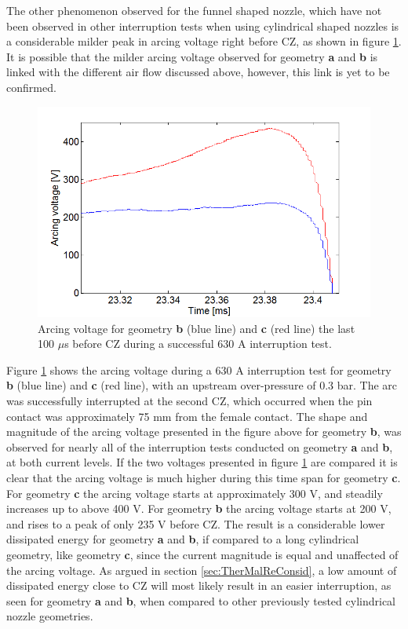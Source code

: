 \documentclass[10pt,b5paper,twoside]{article}
\begin{document}
The other phenomenon observed for the funnel shaped nozzle, which have not been observed in other interruption tests when using cylindrical shaped nozzles is a considerable milder peak in arcing voltage right before CZ, as shown in figure \ref{fig:mildFunnelArcVlotage}. It is possible that the milder arcing voltage observed for geometry \textbf{a} and \textbf{b} is linked with the different air flow discussed above, however, this link is yet to be confirmed.

\begin{figure}[H]
\centering
\includegraphics[scale=0.5]{Bilder/Results/arcingVoltageFunnelandCylinderBandC.png}
\caption{Arcing voltage for geometry \textbf{b} (blue line) and \textbf{c} (red line) the last 100 $\mu$s before CZ during a successful 630 A interruption test.} \label{fig:mildFunnelArcVlotage}
\end{figure}

Figure \ref{fig:mildFunnelArcVlotage} shows the arcing voltage during a 630 A interruption test for geometry \textbf{b} (blue line) and \textbf{c} (red line), with an upstream over-pressure of 0.3 bar. The arc was successfully interrupted at the second CZ, which occurred when the pin contact was approximately 75 mm from the female contact. The shape and magnitude of the arcing voltage presented in the figure above for geometry \textbf{b}, was observed for nearly all of the interruption tests conducted on geometry \textbf{a} and \textbf{b}, at both current levels. If the two voltages presented in figure \ref{fig:mildFunnelArcVlotage} are compared it is clear that the arcing voltage is much higher during this time span for geometry \textbf{c}. For geometry \textbf{c} the arcing voltage starts at approximately 300 V, and steadily increases up to above 400 V. For geometry \textbf{b} the arcing voltage starts at 200 V, and rises to a peak of only 235 V before CZ. The result is a considerable lower dissipated energy for geometry \textbf{a} and \textbf{b}, if compared to a long cylindrical geometry, like geometry \textbf{c}, since the current magnitude is equal and unaffected of the arcing voltage. As argued in section \ref{sec:TherMalReConsid}, a low amount of dissipated energy close to CZ will most likely result in an easier interruption, as seen for geometry \textbf{a} and \textbf{b}, when compared to other previously tested cylindrical nozzle geometries.
\end{document}
